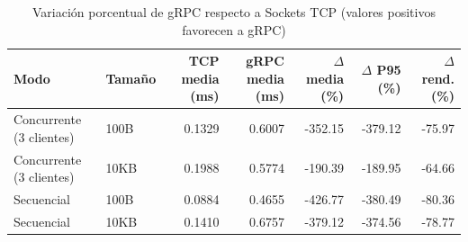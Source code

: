 \begin{table}[htbp]
\centering
\caption{Variación porcentual de gRPC respecto a Sockets TCP (valores positivos favorecen a gRPC)}
\label{tab:comparacion_relativa}
\footnotesize
\begin{tabular}{llrrrrr}
\toprule
Modo & Tamaño & TCP media (ms) & gRPC media (ms) & $\Delta$ media (\%) & $\Delta$ P95 (\%) & $\Delta$ rend. (\%) \\
\midrule
Concurrente (3 clientes) & 100B & 0.1329 & 0.6007 & -352.15 & -379.12 & -75.97 \\
Concurrente (3 clientes) & 10KB & 0.1988 & 0.5774 & -190.39 & -189.95 & -64.66 \\
Secuencial & 100B & 0.0884 & 0.4655 & -426.77 & -380.49 & -80.36 \\
Secuencial & 10KB & 0.1410 & 0.6757 & -379.12 & -374.56 & -78.77 \\
\bottomrule
\end{tabular}
\end{table}
